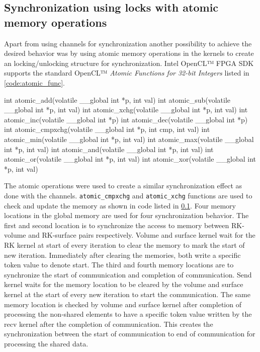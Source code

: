 \subsection{Synchronization using locks with atomic memory operations}

Apart from using channels for synchronization another possibility to achieve
the desired behavior was by using atomic memory operations in the kernels
to create an locking/unlocking structure for synchronization. Intel
OpenCL™ FPGA SDK supports the standard OpenCL™ \textit{Atomic Functions for 32-bit Integers}
listed in \ref{code:atomic_func}.

\begin{CppCode}[caption=Interger versions of the atomic operations supported by Intel
    OpenCL™ FPGA SDK, frame=tlrb, label=code:atomic_func]
int atomic_add(volatile __global int *p, int val)
int atomic_sub(volatile __global int *p, int val)
int atomic_xchg(volatile __global int *p, int val)
int atomic_inc(volatile __global int *p)
int atomic_dec(volatile __global int *p)
int atomic_cmpxchg(volatile __global int *p, int cmp, int val)
int atomic_min(volatile __global int *p, int val)
int atomic_max(volatile __global int *p, int val)
int atomic_and(volatile __global int *p, int val)
int atomic_or(volatile __global int *p, int val)
int atomic_xor(volatile __global int *p, int val)
\end{CppCode}

The atomic operations were used to create a similar synchronization effect as done with the channels.
\texttt{atomic\_cmpxchg} and \texttt{atomic\_xchg} functions are used to check and update the
memory as shown in code listed in \ref{}. Four memory locations in the global memory are used
for four synchronization behavior. The first and second location is to synchronize the access to  memory
between RK-volume and RK-surface pairs respectively. Volume and surface kernel wait for the RK kernel
at start of every iteration to clear the memory to mark the start of new iteration. Immediately
after clearing the memories, both write a specific token value to denote start.
The third and fourth memory locations are to synchronize the start of communication and
completion of communication. Send kernel waits for the memory location to be cleared
by the volume and surface kernel at the start of every new iteration to start the communication.
The same memory location is checked by volume and surface kernel after completion of processing
the non-shared elements to have a specific token value written by the recv kernel after the completion
of communication. This creates the synchronization between the start of communication to end of communication
for processing the shared data.

